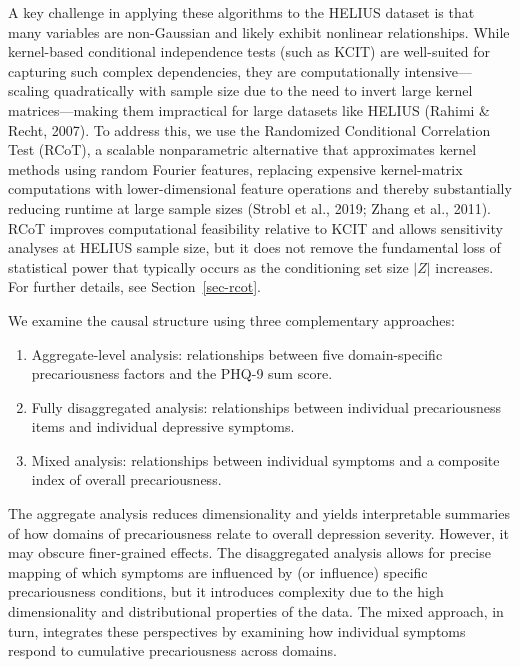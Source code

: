\documentclass[
]{article}
\providecommand{\tightlist}{%
  \setlength{\itemsep}{0pt}\setlength{\parskip}{0pt}}\usepackage{longtable,booktabs,array}
\begin{document}
A key challenge in applying these algorithms to the HELIUS dataset is
that many variables are non-Gaussian and likely exhibit nonlinear
relationships. While kernel-based conditional independence tests (such
as KCIT) are well-suited for capturing such complex dependencies, they
are computationally intensive---scaling quadratically with sample size
due to the need to invert large kernel matrices---making them
impractical for large datasets like HELIUS (Rahimi \& Recht, 2007). To
address this, we use the Randomized Conditional Correlation Test (RCoT),
a
\textcolor{BrickRed}{scalable nonparametric alternative that approximates kernel methods using random Fourier features, replacing expensive kernel-matrix computations with lower-dimensional feature operations and thereby substantially reducing runtime at large sample sizes}
(Strobl et al., 2019; Zhang et al., 2011).
\textcolor{BrickRed}{RCoT improves computational feasibility relative to KCIT and allows sensitivity analyses at HELIUS sample size, but it does not remove the fundamental loss of statistical power that typically occurs as the conditioning set size $|Z|$ increases.}
For further details, see Section~\ref{sec-rcot}.

We examine the causal structure using three complementary approaches:

\begin{enumerate}
\def\labelenumi{\arabic{enumi}.}
\tightlist
\item
  Aggregate-level analysis: relationships between five domain-specific
  precariousness factors and the PHQ-9 sum score.
\item
  Fully disaggregated analysis: relationships between individual
  precariousness items and individual depressive symptoms.
\item
  Mixed analysis: relationships between individual symptoms and a
  composite index of overall precariousness.
\end{enumerate}

The aggregate analysis reduces dimensionality and yields interpretable
summaries of how domains of precariousness relate to overall depression
severity. However, it may obscure finer-grained effects. The
disaggregated analysis allows for precise mapping of which symptoms are
influenced by (or influence) specific precariousness conditions, but it
introduces complexity due to the high dimensionality and distributional
properties of the data. The mixed approach, in turn, integrates these
perspectives by examining how individual symptoms respond to cumulative
precariousness across domains.
\end{document}
